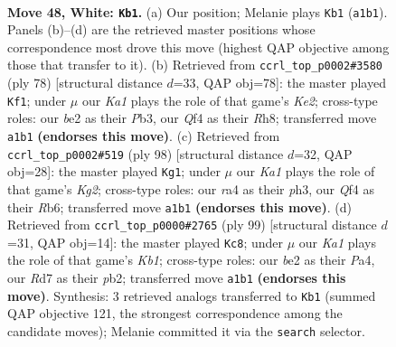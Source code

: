 \documentclass[11pt]{article}
\begin{document}
\clearpage

\begin{figure}[p]\centering
\begin{subfigure}{0.46\textwidth}\centering
\resizebox{\linewidth}{!}{%
\newchessgame
\chessboard[
  setfen={4k3/1p1R4/8/8/r3PQ2/8/4b1PP/K7 w - - 1 48},
  showmover=false,
  pgfstyle=straightmove, color=movearrow, markmove={a1-b1}
]}
\caption{}
\end{subfigure}\hfill
\begin{subfigure}{0.46\textwidth}\centering
\resizebox{\linewidth}{!}{%
\newchessgame
\chessboard[
  setfen={7R/8/8/8/4k2P/1P4p1/P3K2r/8 w - - 2 40},
  showmover=false,
  pgfstyle=straightmove, color=movearrow, markmove={e2-f1}
]}
\caption{}
\end{subfigure}
\\[4pt]
\begin{subfigure}{0.46\textwidth}\centering
\resizebox{\linewidth}{!}{%
\newchessgame
\chessboard[
  setfen={8/8/1R5p/5k2/8/1P5p/3r1PK1/8 w - - 0 50},
  showmover=false,
  pgfstyle=straightmove, color=movearrow, markmove={g2-g1}
]}
\caption{}
\end{subfigure}\hfill
\begin{subfigure}{0.46\textwidth}\centering
\resizebox{\linewidth}{!}{%
\newchessgame
\chessboard[
  setfen={1k6/4R3/p7/4p3/p7/8/1P2r3/2K5 b - - 1 50},
  showmover=false,
  pgfstyle=straightmove, color=movearrow, markmove={b8-c8}
]}
\caption{}
\end{subfigure}
\caption{\textbf{Move 48, White: \texttt{Kb1}.} (a) Our position; Melanie plays \texttt{Kb1} (\texttt{a1b1}). Panels (b)--(d) are the retrieved master positions whose correspondence most drove this move (highest QAP objective among those that transfer to it). (b) Retrieved from \texttt{ccrl\_top\_p0002\#3580} (ply 78) [structural distance $d$=33, QAP obj=78]: the master played \texttt{Kf1}; under $\mu$ our \emph{Ka1} plays the role of that game's \emph{Ke2}; cross-type roles: our \emph{b}e2 as their \emph{P}b3, our \emph{Q}f4 as their \emph{R}h8; transferred move \texttt{a1b1} \textbf{(endorses this move)}. (c) Retrieved from \texttt{ccrl\_top\_p0002\#519} (ply 98) [structural distance $d$=32, QAP obj=28]: the master played \texttt{Kg1}; under $\mu$ our \emph{Ka1} plays the role of that game's \emph{Kg2}; cross-type roles: our \emph{r}a4 as their \emph{p}h3, our \emph{Q}f4 as their \emph{R}b6; transferred move \texttt{a1b1} \textbf{(endorses this move)}. (d) Retrieved from \texttt{ccrl\_top\_p0000\#2765} (ply 99) [structural distance $d$=31, QAP obj=14]: the master played \texttt{Kc8}; under $\mu$ our \emph{Ka1} plays the role of that game's \emph{Kb1}; cross-type roles: our \emph{b}e2 as their \emph{P}a4, our \emph{R}d7 as their \emph{p}b2; transferred move \texttt{a1b1} \textbf{(endorses this move)}. Synthesis: 3 retrieved analogs transferred to \texttt{Kb1} (summed QAP objective 121, the strongest correspondence among the candidate moves); Melanie committed it via the \texttt{search} selector.}
\label{fig:thought-m94}
\end{figure}
\end{document}
